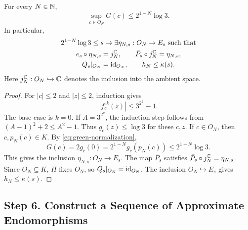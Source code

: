 \begin{lemma}
\label{lem:green-depth}
For every \(N\in\mathbb N\),
\begin{equation}\label{eq:green-depth-bound}
 \sup_{c\in O_N}G(c)\le2^{1-N}\log3.
\end{equation}
In particular,
\begin{equation}\label{eq:green-depth-condition}
 \begin{gathered}
 2^{1-N}\log3\le s\to
  \exists\eta_{N,s}:O_N\to E_s\text{ such that}\\
  e_s\circ\eta_{N,s}=j_N^\mathbb C,\qquad
  \bar P_s\circ j_N^\mathbb C=\eta_{N,s},\\
  Q_s|_{O_N}=\operatorname{id}_{O_N},\qquad h_N\le\kappa(s).
 \end{gathered}
\end{equation}
\noindent
Here \(j_N^\mathbb C:O_N\hookrightarrow\mathbb C\) denotes the inclusion into the
ambient space.
\end{lemma}
\begin{proof}
For \(|c|\le2\) and \(|z|\le2\), induction gives
\[
 |f_c^{\circ k}(z)|\le3^{2^k}-1.
\]
The base case is \(k=0\). If \(A=3^{2^k}\), the induction step follows
from \((A-1)^2+2\le A^2-1\). Thus \(g_c(z)\le\log3\) for these
\(c,z\). If \(c\in O_N\), then \(c,p_N(c)\in K\). By
\eqref{eq:green-normalization},
\[
 G(c)=2g_c(0)=2^{1-N}g_c(p_N(c))
                         \le2^{1-N}\log3.
\]
This gives the inclusion \(\eta_{N,s}:O_N\to E_s\).
The map \(\bar P_s\) satisfies
\(\bar P_s\circ j_N^\mathbb C=\eta_{N,s}\). Since \(O_N\subseteq K\),
\(\Pi\) fixes \(O_N\), so \(Q_s|_{O_N}=\operatorname{id}_{O_N}\). The inclusion
\(O_N\hookrightarrow E_s\) gives \(h_N\le\kappa(s)\).
\end{proof}

\subsection{Step 6. Construct a Sequence of Approximate Endomorphisms}

